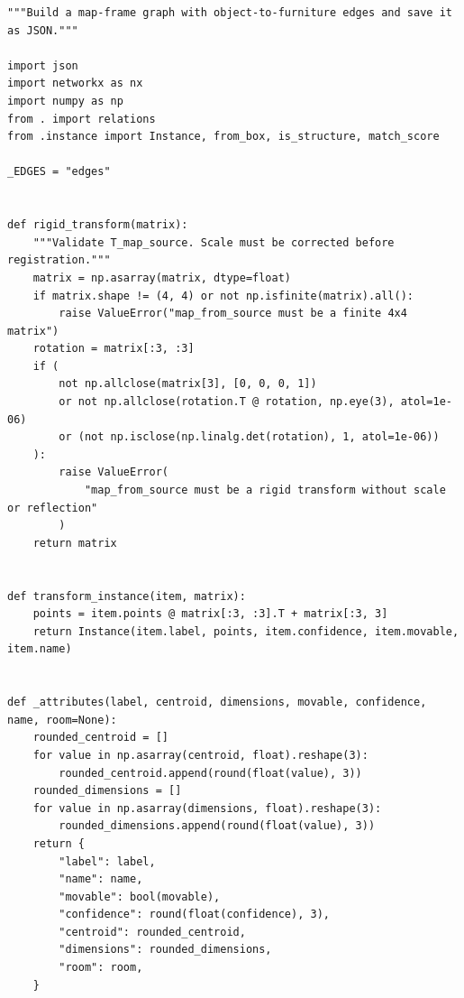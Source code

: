 \documentclass[11pt,a4paper]{book}
\begin{document}
\begin{lstlisting}
"""Build a map-frame graph with object-to-furniture edges and save it as JSON."""

import json
import networkx as nx
import numpy as np
from . import relations
from .instance import Instance, from_box, is_structure, match_score

_EDGES = "edges"


def rigid_transform(matrix):
    """Validate T_map_source. Scale must be corrected before registration."""
    matrix = np.asarray(matrix, dtype=float)
    if matrix.shape != (4, 4) or not np.isfinite(matrix).all():
        raise ValueError("map_from_source must be a finite 4x4 matrix")
    rotation = matrix[:3, :3]
    if (
        not np.allclose(matrix[3], [0, 0, 0, 1])
        or not np.allclose(rotation.T @ rotation, np.eye(3), atol=1e-06)
        or (not np.isclose(np.linalg.det(rotation), 1, atol=1e-06))
    ):
        raise ValueError(
            "map_from_source must be a rigid transform without scale or reflection"
        )
    return matrix


def transform_instance(item, matrix):
    points = item.points @ matrix[:3, :3].T + matrix[:3, 3]
    return Instance(item.label, points, item.confidence, item.movable, item.name)


def _attributes(label, centroid, dimensions, movable, confidence, name, room=None):
    rounded_centroid = []
    for value in np.asarray(centroid, float).reshape(3):
        rounded_centroid.append(round(float(value), 3))
    rounded_dimensions = []
    for value in np.asarray(dimensions, float).reshape(3):
        rounded_dimensions.append(round(float(value), 3))
    return {
        "label": label,
        "name": name,
        "movable": bool(movable),
        "confidence": round(float(confidence), 3),
        "centroid": rounded_centroid,
        "dimensions": rounded_dimensions,
        "room": room,
    }



\end{lstlisting}
\end{document}
